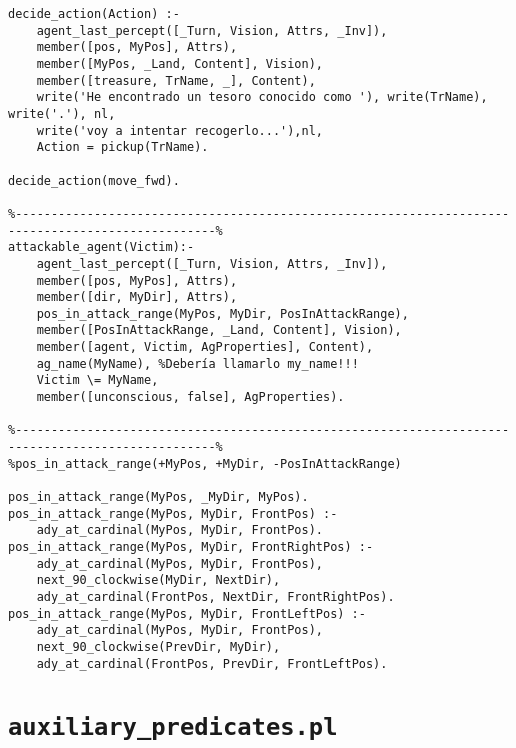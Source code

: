 \documentclass[a4paper,12pt]{report}
\begin{document}
\begin{scriptsize}
\begin{verbatim}
decide_action(Action) :-
    agent_last_percept([_Turn, Vision, Attrs, _Inv]),
    member([pos, MyPos], Attrs),
    member([MyPos, _Land, Content], Vision),
    member([treasure, TrName, _], Content),
    write('He encontrado un tesoro conocido como '), write(TrName), write('.'), nl,
    write('voy a intentar recogerlo...'),nl,
    Action = pickup(TrName).

decide_action(move_fwd).

%--------------------------------------------------------------------------------------------------%
attackable_agent(Victim):-
    agent_last_percept([_Turn, Vision, Attrs, _Inv]),
    member([pos, MyPos], Attrs),
    member([dir, MyDir], Attrs),
    pos_in_attack_range(MyPos, MyDir, PosInAttackRange),
    member([PosInAttackRange, _Land, Content], Vision),
    member([agent, Victim, AgProperties], Content),
    ag_name(MyName), %Debería llamarlo my_name!!!
    Victim \= MyName,
    member([unconscious, false], AgProperties).

%--------------------------------------------------------------------------------------------------%
%pos_in_attack_range(+MyPos, +MyDir, -PosInAttackRange)

pos_in_attack_range(MyPos, _MyDir, MyPos).
pos_in_attack_range(MyPos, MyDir, FrontPos) :-
    ady_at_cardinal(MyPos, MyDir, FrontPos).
pos_in_attack_range(MyPos, MyDir, FrontRightPos) :-
    ady_at_cardinal(MyPos, MyDir, FrontPos),
    next_90_clockwise(MyDir, NextDir),
    ady_at_cardinal(FrontPos, NextDir, FrontRightPos).
pos_in_attack_range(MyPos, MyDir, FrontLeftPos) :-
    ady_at_cardinal(MyPos, MyDir, FrontPos),
    next_90_clockwise(PrevDir, MyDir),
    ady_at_cardinal(FrontPos, PrevDir, FrontLeftPos).

\end{verbatim}
\end{scriptsize}

\section{\texttt{auxiliary\_predicates.pl}}
\end{document}
